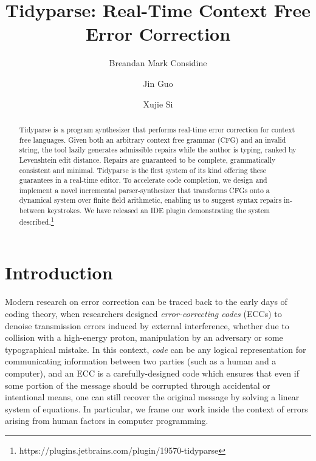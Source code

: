 \documentclass[sigplan,nonacm]{acmart}\settopmatter{printfolios=false,printccs=false,printacmref=false}
\begin{document}
\title{Tidyparse: Real-Time Context Free Error Correction}
\begin{abstract}
Tidyparse is a program synthesizer that performs real-time error correction for context free languages.
Given both an arbitrary context free grammar (CFG) and an invalid string, the tool lazily generates admissible repairs while the author is typing, ranked by Levenshtein edit distance.
 Repairs are guaranteed to be complete, grammatically consistent and minimal.
 Tidyparse is the first system of its kind offering these guarantees in a real-time editor. To accelerate code completion, we design and implement a novel incremental parser-synthesizer that transforms CFGs onto a dynamical system over finite field arithmetic, enabling us to suggest syntax repairs in-between keystrokes. We have released an IDE plugin demonstrating the system described.\footnote{https://plugins.jetbrains.com/plugin/19570-tidyparse}
\end{abstract}

\author{Breandan Mark Considine}

\author{Jin Guo}

\author{Xujie Si}

\maketitle

\section{Introduction}

Modern research on error correction can be traced back to the early days of coding theory, when researchers designed \textit{error-correcting codes} (ECCs) to denoise transmission errors induced by external interference, whether due to collision with a high-energy proton, manipulation by an adversary or some typographical mistake. In this context, \textit{code} can be any logical representation for communicating information between two parties (such as a human and a computer), and an ECC is a carefully-designed code which ensures that even if some portion of the message should be corrupted through accidental or intentional means, one can still recover the original message by solving a linear system of equations. In particular, we frame our work inside the context of errors arising from human factors in computer programming.
\end{document}
